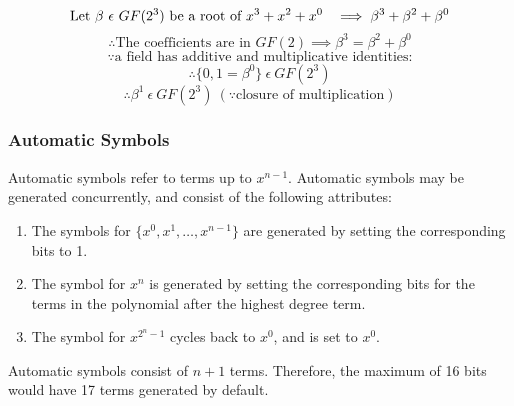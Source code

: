         \[ \text{Let }\beta \ \epsilon \ GF(2^{3}) \text{ be a root of
                $x^{3}+x^{2}+x^{0}$~ }\implies \beta^{3}+\beta^{2}+\beta^{0} \]
        \[ \therefore \text{The coefficients are in }GF(2) \implies
        \beta^{3}=\beta^{2}+\beta^{0} \]
        \[ \because \text{a field has additive and multiplicative identities:}
        \]
        \[ \therefore \{ 0, 1=\beta^{0} \} \ \epsilon \ GF(2^{3}) \]
        \[ \therefore \beta^{1} \ \epsilon \ GF(2^{3}) \ (\because \text{closure of  multiplication}) \]

    \subsubsection{Automatic Symbols}

    Automatic symbols refer to terms up to $x^{n-1}$. Automatic symbols may be
    generated concurrently, and consist of the following attributes:
    \begin{enumerate}
        \item The symbols for $\{x^{0}, x^{1}, \ldots, x^{n-1}\}$ are generated
        by setting the corresponding bits to 1.
        \item The symbol for $x^{n}$ is generated by setting the corresponding
        bits for the terms in the polynomial after the highest degree term.
        \item The symbol for $x^{2^{n}-1}$ cycles back to $x^{0}$, and is set
        to $x^{0}$.
    \end{enumerate}

        Automatic symbols consist of $n+1$ terms. Therefore, the maximum of 16
        bits would have 17 terms generated by default.

